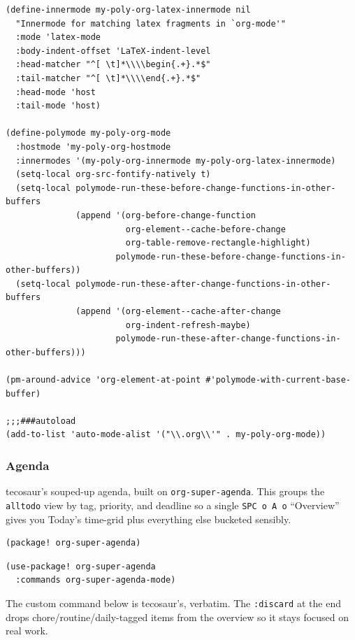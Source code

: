 \documentclass[11pt]{article}
\begin{document}
\begin{verbatim}
(define-innermode my-poly-org-latex-innermode nil
  "Innermode for matching latex fragments in `org-mode'"
  :mode 'latex-mode
  :body-indent-offset 'LaTeX-indent-level
  :head-matcher "^[ \t]*\\\\begin{.+}.*$"
  :tail-matcher "^[ \t]*\\\\end{.+}.*$"
  :head-mode 'host
  :tail-mode 'host)

(define-polymode my-poly-org-mode
  :hostmode 'my-poly-org-hostmode
  :innermodes '(my-poly-org-innermode my-poly-org-latex-innermode)
  (setq-local org-src-fontify-natively t)
  (setq-local polymode-run-these-before-change-functions-in-other-buffers
              (append '(org-before-change-function
                        org-element--cache-before-change
                        org-table-remove-rectangle-highlight)
                      polymode-run-these-before-change-functions-in-other-buffers))
  (setq-local polymode-run-these-after-change-functions-in-other-buffers
              (append '(org-element--cache-after-change
                        org-indent-refresh-maybe)
                      polymode-run-these-after-change-functions-in-other-buffers)))

(pm-around-advice 'org-element-at-point #'polymode-with-current-base-buffer)

;;;###autoload
(add-to-list 'auto-mode-alist '("\\.org\\'" . my-poly-org-mode))
\end{verbatim}
\subsubsection{Agenda}
\label{sec:org87907ff}
tecosaur's souped-up agenda, built on \texttt{org-super-agenda}. This groups
the \texttt{alltodo} view by tag, priority, and deadline so a single \texttt{SPC o A
o} ``Overview'' gives you Today's time-grid plus everything else bucketed
sensibly.

\begin{verbatim}
(package! org-super-agenda)
\end{verbatim}

\begin{verbatim}
(use-package! org-super-agenda
  :commands org-super-agenda-mode)
\end{verbatim}

The custom command below is tecosaur's, verbatim. The \texttt{:discard} at
the end drops chore/routine/daily-tagged items from the overview so it
stays focused on real work.
\end{document}
